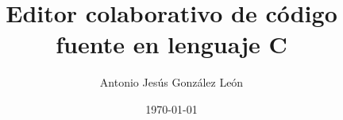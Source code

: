 \documentclass[a4paper,11pt,twoside]{book}
\title{Editor colaborativo de código fuente en lenguaje C}
\author{Antonio Jesús González León}
\date{\today}
\begin{document}
        

        


        \frontmatter

        \tableofcontents
        \listoffigures



        \mainmatter

	
	
	
	


	\nocite{*}	%
	
	
\end{document}
